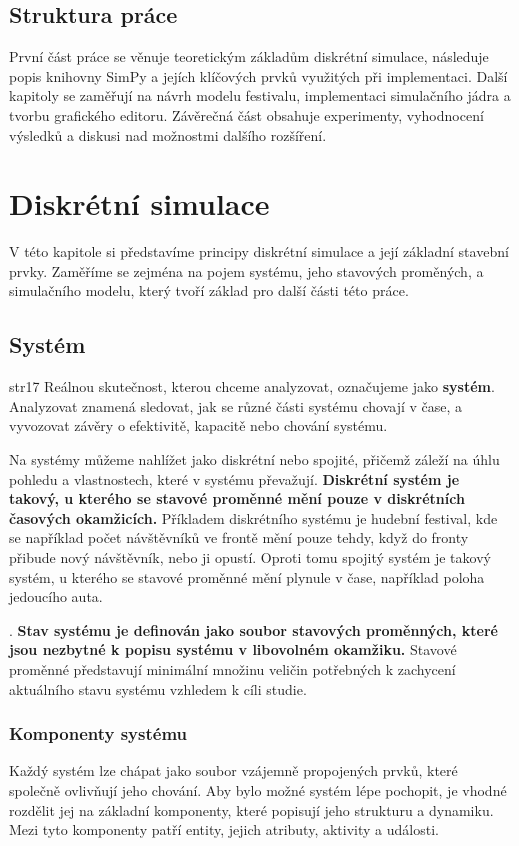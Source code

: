 \documentclass[12pt,a4paper]{article}
\begin{document}
\subsection{Struktura práce}
První část práce se věnuje teoretickým základům diskrétní simulace, následuje popis knihovny SimPy a jejích klíčových prvků využitých při implementaci. Další kapitoly se zaměřují na návrh modelu festivalu, implementaci simulačního jádra a tvorbu grafického editoru. Závěrečná část obsahuje experimenty, vyhodnocení výsledků a diskusi nad možnostmi dalšího rozšíření.


\section{Diskrétní simulace}
V této kapitole si představíme principy diskrétní simulace a její základní stavební prvky. Zaměříme se zejména na pojem systému, jeho stavových proměných, a simulačního modelu, který tvoří základ pro další části této práce.

\subsection{Systém} str17
Reálnou skutečnost, kterou chceme analyzovat, označujeme jako {\bf systém}. Analyzovat znamená sledovat, jak se různé části systému chovají v čase, a vyvozovat závěry o efektivitě, kapacitě nebo chování systému.

Na systémy můžeme nahlížet jako diskrétní nebo spojité, přičemž záleží na úhlu pohledu a vlastnostech, které v systému převažují. {\bf Diskrétní systém je takový, u kterého se stavové proměnné mění pouze v diskrétních časových okamžicích.} Příkladem diskrétního systému je hudební festival, kde se například počet návštěvníků ve frontě mění pouze tehdy, když do fronty přibude nový návštěvník, nebo ji opustí.  Oproti tomu spojitý systém je takový systém, u kterého se stavové proměnné mění plynule v čase, například poloha jedoucího auta. 

. {\bf Stav systému je definován jako soubor stavových proměnných, které jsou nezbytné k popisu systému v libovolném okamžiku.} Stavové proměnné představují minimální množinu veličin potřebných k zachycení aktuálního stavu systému vzhledem k cíli studie.


\subsubsection{Komponenty systému}
Každý systém lze chápat jako soubor vzájemně propojených prvků, které společně ovlivňují jeho chování. Aby bylo možné systém lépe pochopit, je vhodné rozdělit jej na základní komponenty, které popisují jeho strukturu a dynamiku. Mezi tyto komponenty patří entity, jejich atributy, aktivity a události.
\end{document}

